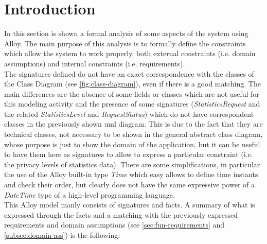 \documentclass[a4paper]{report}
\begin{document}
\section{Introduction}
In this section is shown a formal analysis of some aspects of the system using Alloy. The main purpose of this analysis is to formally define the constraints which allow the system to work properly, both external constraints (i.e. domain assumptions) and internal constraints (i.e. requirements). \\
The signatures defined do not have an exact correspondence with the classes of the Class Diagram (see \ref{fig:class-diagram}), even if there is a good matching. The main differences are the absence of some fields or classes which are not useful for this modeling activity and the presence of some signatures (\textit{StatisticsRequest} and the related \textit{StatisticsLevel} and \textit{RequestStatus}) which do not have correspondent classes in the previously shown uml diagram. This is due to the fact that they are technical classes, not necessary to be shown in the general abstract class diagram, whose purpose is just to show the domain of the application, but it can be useful to have them here as signatures to allow to express a particular constraint (i.e. the privacy levels of statistics data). There are some simplifications, in particular the use of the Alloy built-in type \textit{Time} which easy allows to define time instants and check their order, but clearly does not have the same expressive power of a \textit{DateTime} type of a high-level programming language.\\
This Alloy model manly consists of signatures and facts. A summary of what is expressed through the facts and a matching with the previously expressed requirements and domain assumptions (see \ref{sec:fun-requirements} and \ref{subsec:domain-ass}) is the following:
\end{document}

